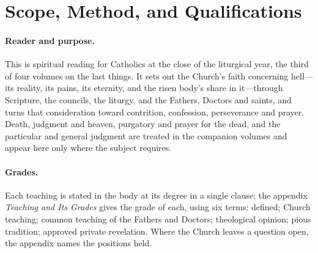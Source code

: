 \section{Scope, Method, and Qualifications}

\paragraph{Reader and purpose.} This is spiritual reading for Catholics at the close of the liturgical year, the third of four volumes on the last things. It sets out the Church's faith concerning hell---its reality, its pains, its eternity, and the risen body's share in it---through Scripture, the councils, the liturgy, and the Fathers, Doctors and saints, and turns that consideration toward contrition, confession, perseverance and prayer. Death, judgment and heaven, purgatory and prayer for the dead, and the particular and general judgment are treated in the companion volumes and appear here only where the subject requires.

\paragraph{Grades.} Each teaching is stated in the body at its degree in a single clause; the appendix \emph{Teaching and Its Grades} gives the grade of each, using six terms: defined; Church teaching; common teaching of the Fathers and Doctors; theological opinion; pious tradition; approved private revelation. Where the Church leaves a question open, the appendix names the positions held.

